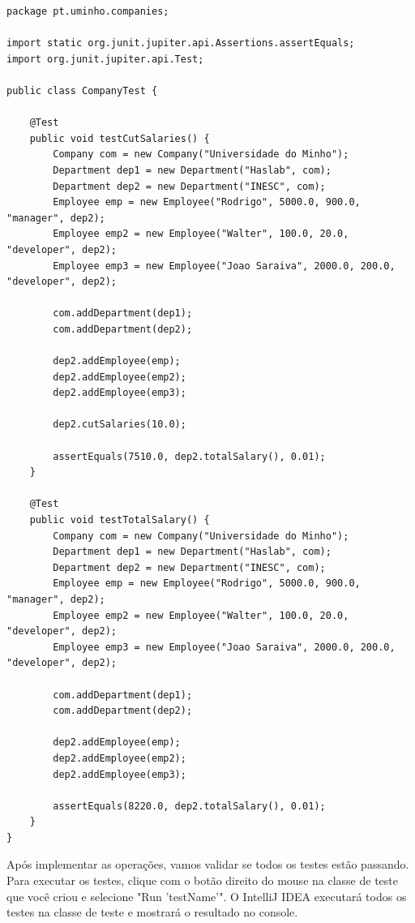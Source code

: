 \documentclass{article}
\begin{document}
\begin{lstlisting}[caption={Classe CompanyTest},label={anoniTolambda},captionpos=t]
package pt.uminho.companies;

import static org.junit.jupiter.api.Assertions.assertEquals;
import org.junit.jupiter.api.Test;

public class CompanyTest {
	
	@Test
	public void testCutSalaries() {
		Company com = new Company("Universidade do Minho");
		Department dep1 = new Department("Haslab", com);
		Department dep2 = new Department("INESC", com);
		Employee emp = new Employee("Rodrigo", 5000.0, 900.0, "manager", dep2);
		Employee emp2 = new Employee("Walter", 100.0, 20.0, "developer", dep2);
		Employee emp3 = new Employee("Joao Saraiva", 2000.0, 200.0, "developer", dep2);
		
		com.addDepartment(dep1);
		com.addDepartment(dep2);
		
		dep2.addEmployee(emp);
		dep2.addEmployee(emp2);
		dep2.addEmployee(emp3);
		
		dep2.cutSalaries(10.0);

		assertEquals(7510.0, dep2.totalSalary(), 0.01);
	}
	
	@Test
	public void testTotalSalary() {
		Company com = new Company("Universidade do Minho");
		Department dep1 = new Department("Haslab", com);
		Department dep2 = new Department("INESC", com);
		Employee emp = new Employee("Rodrigo", 5000.0, 900.0, "manager", dep2);
		Employee emp2 = new Employee("Walter", 100.0, 20.0, "developer", dep2);
		Employee emp3 = new Employee("Joao Saraiva", 2000.0, 200.0, "developer", dep2);
		
		com.addDepartment(dep1);
		com.addDepartment(dep2);
		
		dep2.addEmployee(emp);
		dep2.addEmployee(emp2);
		dep2.addEmployee(emp3);
		
		assertEquals(8220.0, dep2.totalSalary(), 0.01);
	}
}

\end{lstlisting}

Após implementar as operações, vamos validar se todos os testes estão passando. Para executar os testes, clique com o botão direito do mouse na classe de teste que você criou e selecione "Run 'testName'". O IntelliJ IDEA executará todos os testes na classe de teste e mostrará o resultado no console. 





\end{document}
